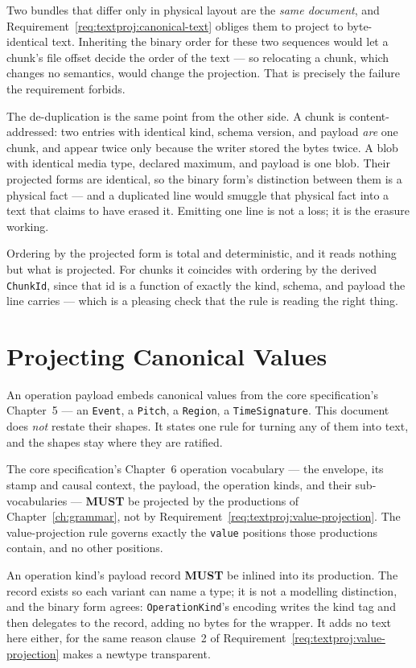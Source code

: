 \documentclass[11pt,letterpaper]{report}
\newcounter{requirement}[chapter]
\newcommand{\MUST}{\textbf{MUST}}
\begin{document}
\begin{rationale}
  Two bundles that differ only in physical layout are the \emph{same document},
  and Requirement~\ref{req:textproj:canonical-text} obliges them to project to
  byte-identical text. Inheriting the binary order for these two sequences would
  let a chunk's file offset decide the order of the text --- so relocating a chunk,
  which changes no semantics, would change the projection. That is precisely the
  failure the requirement forbids.

  The de-duplication is the same point from the other side. A chunk is
  content-addressed: two entries with identical kind, schema version, and payload
  \emph{are} one chunk, and appear twice only because the writer stored the bytes
  twice. A blob with identical media type, declared maximum, and payload is one
  blob. Their projected forms are identical, so the binary form's distinction
  between them is a physical fact --- and a duplicated line would smuggle that
  physical fact into a text that claims to have erased it. Emitting one line is
  not a loss; it is the erasure working.

  Ordering by the projected form is total and deterministic, and it reads nothing
  but what is projected. For chunks it coincides with ordering by the derived
  \texttt{ChunkId}, since that id is a function of exactly the kind, schema, and
  payload the line carries --- which is a pleasing check that the rule is reading
  the right thing.
\end{rationale}

\section{Projecting Canonical Values}
\label{sec:content:values}

An operation payload embeds canonical values from the core specification's
Chapter~5 --- an \texttt{Event}, a \texttt{Pitch}, a \texttt{Region}, a
\texttt{TimeSignature}. This document does \emph{not} restate their shapes. It
states one rule for turning any of them into text, and the shapes stay where they
are ratified.

\begin{requirement}
  \label{req:textproj:operation-vocabulary}
  The core specification's Chapter~6 operation vocabulary --- the envelope, its
  stamp and causal context, the payload, the operation kinds, and their
  sub-vocabularies --- \MUST{} be projected by the productions of
  Chapter~\ref{ch:grammar}, not by
  Requirement~\ref{req:textproj:value-projection}. The value-projection
  rule governs exactly the \texttt{value} positions those productions contain,
  and no other positions.

  An operation kind's payload record \MUST{} be inlined into its production. The
  record exists so each variant can name a type; it is not a modelling
  distinction, and the binary form agrees: \texttt{OperationKind}'s encoding
  writes the kind tag and then delegates to the record, adding no bytes for the
  wrapper. It adds no text here either, for the same reason clause~2 of
  Requirement~\ref{req:textproj:value-projection} makes a newtype transparent.
\end{requirement}
\end{document}
